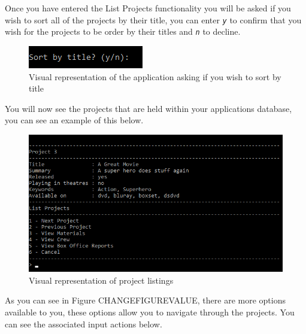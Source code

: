 \documentclass[
  english,
  a4paper,
,tablecaptionabove
]{scrartcl}
\begin{document}
Once you have entered the List Projects functionality you will be asked
if you wish to sort all of the projects by their title, you can enter
\emph{\texttt{y}} to confirm that you wish for the projects to be order
by their titles and \emph{\texttt{n}} to decline.

\begin{figure}
\centering
\includegraphics{images/user-guide/view-mode/sort-by-title.png}
\caption{Visual representation of the application asking if you wish to
sort by title}
\end{figure}

You will now see the projects that are held within your applications
database, you can see an example of this below.

\begin{figure}
\centering
\includegraphics{images/user-guide/view-mode/listed-projects.png}
\caption{Visual representation of project listings}
\end{figure}

As you can see in Figure CHANGEFIGUREVALUE, there are more options
available to you, these options allow you to navigate through the
projects. You can see the associated input actions below.
\end{document}
